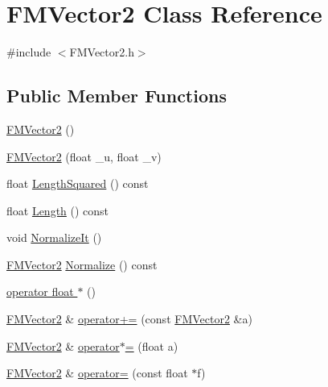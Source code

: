 \hypertarget{classFMVector2}{
\section{FMVector2 Class Reference}
\label{classFMVector2}
}


{\ttfamily \#include $<$FMVector2.h$>$}

\subsection*{Public Member Functions}
\begin{DoxyCompactItemize}
\item 
\hyperlink{classFMVector2_aa96a0629fd333f71e455fcc2069b3193}{FMVector2} ()
\item 
\hyperlink{classFMVector2_a29aeec6ea2cf4feb0375af535f8e7490}{FMVector2} (float \_\-u, float \_\-v)
\item 
float \hyperlink{classFMVector2_a9058c2c9c8d6f3904d1f830572269271}{LengthSquared} () const 
\item 
float \hyperlink{classFMVector2_ad59987a2ec38d77461b127c6774b2b2c}{Length} () const 
\item 
void \hyperlink{classFMVector2_a09f58542bf08b4e6e1f79881e7287057}{NormalizeIt} ()
\item 
\hyperlink{classFMVector2}{FMVector2} \hyperlink{classFMVector2_aecb7fbc50f98a61510a80b97c9b0ca64}{Normalize} () const 
\item 
\hyperlink{classFMVector2_ac7b603a55230c6f7d50a5706f5266c91}{operator float $\ast$} ()
\item 
\hyperlink{classFMVector2}{FMVector2} \& \hyperlink{classFMVector2_a10996ad35ebbe593238dd505232cbad9}{operator+=} (const \hyperlink{classFMVector2}{FMVector2} \&a)
\item 
\hyperlink{classFMVector2}{FMVector2} \& \hyperlink{classFMVector2_a694e6f2df85e23d500a0d7a6fa79d78f}{operator$\ast$=} (float a)
\item 
\hyperlink{classFMVector2}{FMVector2} \& \hyperlink{classFMVector2_aa4138ab608dde492d0f7fa5cb61b225c}{operator=} (const float $\ast$f)
\end{DoxyCompactItemize}
